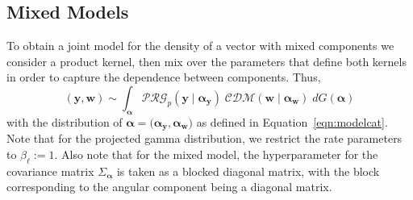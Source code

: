 \subsection{Mixed Models}
To obtain a joint model for the density of a vector with mixed components
    we consider a product kernel, then mix over the parameters that define 
    both kernels in order to capture the dependence between components. Thus,
    \begin{equation}
        \label{model:mixed}
        (\bm{y},\bm{w})\sim \int_{\bm{\alpha}}\mathcal{PRG}_{p}
            (\bm{y}\mid\bm{\alpha}_{\bm{y}})
        \;\mathcal{CDM}(\bm{w}\mid\bm{\alpha}_{\bm{w}})\;dG(\bm{\alpha})
    \end{equation}
  with the distribution of $\bm{\alpha}=(\bm{\alpha_\bm{y},\bm{\alpha_\bm{w}})}$ as
    defined in Equation~\ref{eqn:modelcat}. Note that for 
    the projected gamma distribution, we restrict the rate parameters 
    to $\beta_{\ell} := 1$.  Also note that for the mixed model, the hyperparameter 
    for the covariance matrix $\Sigma_{\bm{\alpha}}$ is taken as a blocked diagonal 
    matrix, with the block corresponding to the angular component being a 
    diagonal matrix.

